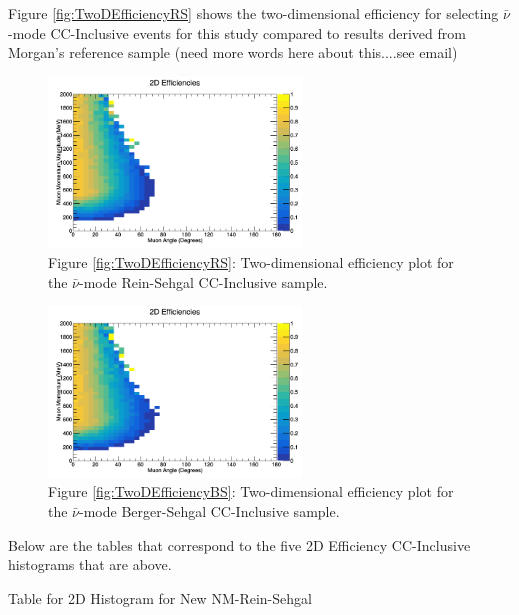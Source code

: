 \documentclass[11pt]{article}
\begin{document}
Figure \ref*{fig:TwoDEfficiencyRS} shows the two-dimensional efficiency for selecting $\bar{\nu}$-mode CC-Inclusive events for this study compared to results derived from Morgan's reference sample (need more words here about this....see email)

\begin{figure}[H]
\centering
\includegraphics[width=0.6\textwidth]{CCInclusivePlots/2DEffCompareANMRS.png}
\caption*{Figure \ref*{fig:TwoDEfficiencyRS}: Two-dimensional efficiency plot for the $\bar{\nu}$-mode Rein-Sehgal CC-Inclusive sample.}
\end{figure}\label{fig:TwoDEfficiencyRS}

\begin{figure}[H]
\centering
\includegraphics[width=0.6\textwidth]{CCInclusivePlots/2DEffCompareANMBS.png}
\caption*{Figure \ref*{fig:TwoDEfficiencyBS}: Two-dimensional efficiency plot for the $\bar{\nu}$-mode Berger-Sehgal CC-Inclusive sample.}
\end{figure}\label{fig:TwoDEfficiencyBS}

Below are the tables that correspond to the five 2D Efficiency CC-Inclusive histograms that are above.

\newpage
\begin{landscape}
\begin{table}
\centering
\caption{Table for 2D Histogram for New NM-Rein-Sehgal}
\begin{adjustbox}{width=\paperwidth}
\end{adjustbox}
\end{table}
\end{landscape}
\end{document}
